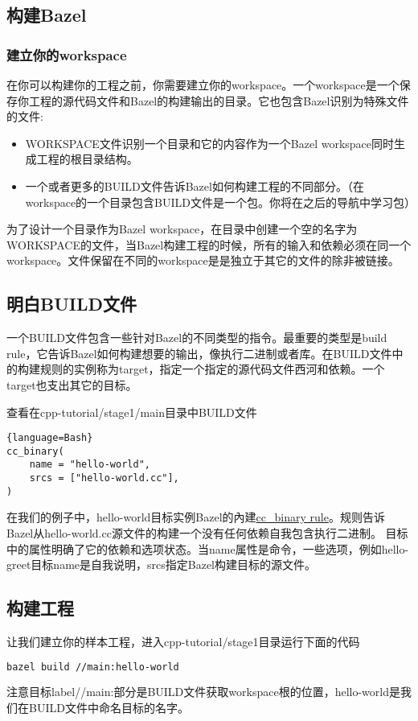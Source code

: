 \subsection{构建Bazel}
\subsubsection{建立你的workspace}
在你可以构建你的工程之前，你需要建立你的workspace。一个workspace是一个保存你工程的源代码文件和Bazel的构建输出的目录。它也包含Bazel识别为特殊文件的文件:
\begin{itemize}
	\item WORKSPACE文件识别一个目录和它的内容作为一个Bazel workspace同时生成工程的根目录结构。
	\item 一个或者更多的BUILD文件告诉Bazel如何构建工程的不同部分。（在workspace的一个目录包含BUILD文件是一个包。你将在之后的导航中学习包）
\end{itemize}
为了设计一个目录作为Bazel workspace，在目录中创建一个空的名字为WORKSPACE的文件，当Bazel构建工程的时候，所有的输入和依赖必须在同一个workspace。文件保留在不同的workspace是是独立于其它的文件的除非被链接。
\subsection{明白BUILD文件}
一个BUILD文件包含一些针对Bazel的不同类型的指令。最重要的类型是build rule，它告诉Bazel如何构建想要的输出，像执行二进制或者库。在BUILD文件中的构建规则的实例称为target，指定一个指定的源代码文件西河和依赖。一个target也支出其它的目标。

查看在cpp-tutorial/stage1/main目录中BUILD文件
\begin{lstlisting}{language=Bash}
cc_binary(
    name = "hello-world",
    srcs = ["hello-world.cc"],
)
\end{lstlisting}
在我们的例子中，hello-world目标实例Bazel的內建\href{https://docs.bazel.build/versions/master/be/c-cpp.html#cc_binary}{cc\_binary rule}。规则告诉Bazel从hello-world.cc源文件的构建一个没有任何依赖自我包含执行二进制。
目标中的属性明确了它的依赖和选项状态。当name属性是命令，一些选项，例如hello-greet目标name是自我说明，srcs指定Bazel构建目标的源文件。
\subsection{构建工程}
让我们建立你的样本工程，进入cpp-tutorial/stage1目录运行下面的代码
\begin{lstlisting}[language=Bash]
bazel build //main:hello-world
\end{lstlisting}
注意目标label//main:部分是BUILD文件获取workspace根的位置，hello-world是我们在BUILD文件中命名目标的名字。


